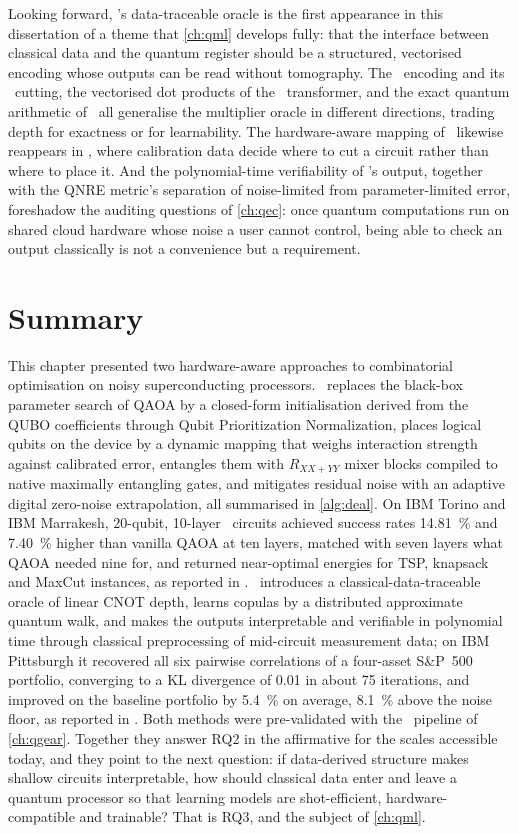 Looking forward, \qawa's data-traceable oracle is the first appearance in this dissertation of a theme that \cref{ch:qml} develops fully: that the interface between classical data and the quantum register should be a structured, vectorised encoding whose outputs can be read without tomography. The \qcrank\ encoding and its \shardq\ cutting, the vectorised dot products of the \vqt\ transformer, and the exact quantum arithmetic of \nnqa\ all generalise the multiplier oracle in different directions, trading depth for exactness or for learnability. The hardware-aware mapping of \deal\ likewise reappears in \shardq, where calibration data decide where to cut a circuit rather than where to place it. And the polynomial-time verifiability of \qawa's output, together with the QNRE metric's separation of noise-limited from parameter-limited error, foreshadow the auditing questions of \cref{ch:qec}: once quantum computations run on shared cloud hardware whose noise a user cannot control, being able to check an output classically is not a convenience but a requirement.

\section{Summary}\label{sec:nisq:summary}

This chapter presented two hardware-aware approaches to combinatorial optimisation on noisy superconducting processors. \deal\ replaces the black-box parameter search of QAOA by a closed-form initialisation derived from the QUBO coefficients through Qubit Prioritization Normalization, places logical qubits on the device by a dynamic mapping that weighs interaction strength against calibrated error, entangles them with $R_{XX+YY}$ mixer blocks compiled to native maximally entangling gates, and mitigates residual noise with an adaptive digital zero-noise extrapolation, all summarised in \cref{alg:deal}. On IBM Torino and IBM Marrakesh, 20-qubit, 10-layer \deal\ circuits achieved success rates \SI{14.81}{\percent} and \SI{7.40}{\percent} higher than vanilla QAOA at ten layers, matched with seven layers what QAOA needed nine for, and returned near-optimal energies for TSP, knapsack and MaxCut instances, as reported in \cite{guo2025deal}. \qawa\ introduces a classical-data-traceable oracle of linear CNOT depth, learns copulas by a distributed approximate quantum walk, and makes the outputs interpretable and verifiable in polynomial time through classical preprocessing of mid-circuit measurement data; on IBM Pittsburgh it recovered all six pairwise correlations of a four-asset S\&P~500 portfolio, converging to a KL divergence of 0.01 in about 75 iterations, and improved on the baseline portfolio by \SI{5.4}{\percent} on average, \SI{8.1}{\percent} above the noise floor, as reported in \cite{guo2025qawa}. Both methods were pre-validated with the \qgear\ pipeline of \cref{ch:qgear}. Together they answer RQ2 in the affirmative for the scales accessible today, and they point to the next question: if data-derived structure makes shallow circuits interpretable, how should classical data enter and leave a quantum processor so that learning models are shot-efficient, hardware-compatible and trainable? That is RQ3, and the subject of \cref{ch:qml}.
